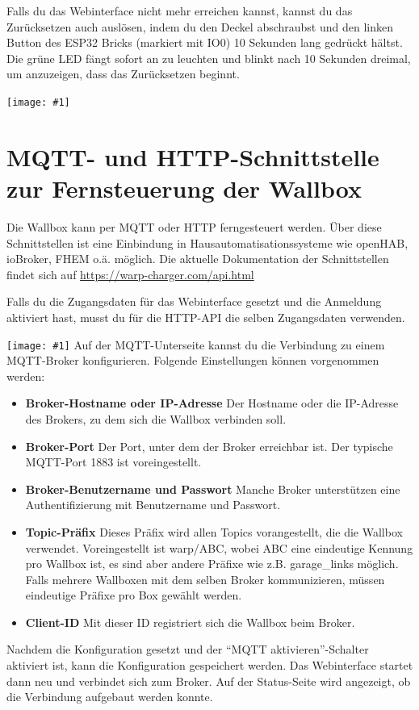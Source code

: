 \documentclass[a4paper,10pt]{article}
\newcommand{\gfx}[1]{\texttt{[image: \#1]}}
\begin{document}
\begin{multicols*}{2}
	Falls du das Webinterface nicht mehr erreichen kannst, kannst du das Zurücksetzen auch
	auslösen, indem du den Deckel abschraubst und den linken Button des ESP32 Bricks (markiert mit IO0)
	10 Sekunden lang gedrückt hältst. Die grüne LED fängt sofort an zu leuchten und blinkt nach 10 Sekunden
	dreimal, um anzuzeigen, dass das Zurücksetzen beginnt.

	\vfill

	\gfx{./img/resized/warp_esp_open}
	\newpage
	\section{MQTT- und HTTP-Schnittstelle zur Fernsteuerung der Wallbox}
	Die Wallbox kann per MQTT oder HTTP ferngesteuert werden. Über diese Schnittstellen ist eine
	Einbindung in Hausautomatisationssysteme wie openHAB, ioBroker, FHEM o.ä. möglich. Die aktuelle
	Dokumentation der Schnittstellen findet sich auf \url{https://warp-charger.com/api.html}

	Falls du die Zugangsdaten für das Webinterface gesetzt und die Anmeldung aktiviert hast, musst du
	für die HTTP-API die selben Zugangsdaten verwenden.

	\gfx{./img/resized/web_mqtt}
	Auf der MQTT-Unterseite kannst du die Verbindung zu einem MQTT-Broker konfigurieren. Folgende Einstellungen können vorgenommen werden:
	\begin{itemize}
		\item \textbf{Broker-Hostname oder IP-Adresse} Der Hostname oder die IP-Adresse des Brokers, zu dem sich die Wallbox verbinden soll.
		\item \textbf{Broker-Port} Der Port, unter dem der Broker erreichbar ist. Der typische MQTT-Port 1883 ist voreingestellt.
		\item \textbf{Broker-Benutzername und Passwort} Manche Broker unterstützen eine Authentifizierung mit Benutzername und Passwort.
		\item \textbf{Topic-Präfix} Dieses Präfix wird allen Topics vorangestellt, die die Wallbox verwendet.
		      Voreingestellt ist warp/ABC, wobei ABC eine eindeutige Kennung pro Wallbox ist,
		      es sind aber andere Präfixe wie z.B. garage\_links möglich.
		      Falls mehrere Wallboxen mit dem selben Broker kommunizieren,
		      müssen eindeutige Präfixe pro Box gewählt werden.
		\item \textbf{Client-ID} Mit dieser ID registriert sich die Wallbox beim Broker.
	\end{itemize}
	Nachdem die Konfiguration gesetzt und der \enquote{MQTT aktivieren}-Schalter aktiviert ist, kann die Konfiguration gespeichert werden.
	Das Webinterface startet dann neu und verbindet sich zum Broker.
	Auf der Status-Seite wird angezeigt, ob die Verbindung aufgebaut werden konnte.


\end{multicols*}
\end{document}
